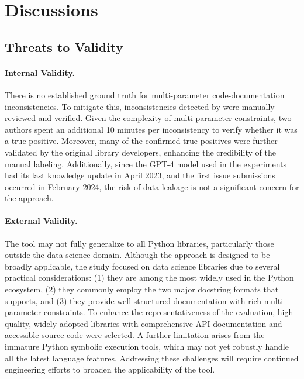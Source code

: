\section{Discussions}

\subsection{Threats to Validity}\label{sec:valid-mpchecker}

\paragraph{Internal Validity.}
There is no established ground truth for multi-parameter code-documentation inconsistencies. To
mitigate this, inconsistencies detected by \toolchecker were manually reviewed and verified. Given the
complexity of multi-parameter constraints, two authors spent an additional 10 minutes per
inconsistency to verify whether it was a true positive. Moreover, many of the confirmed true positives were further validated by the original library developers, enhancing the credibility of the manual labeling. Additionally, since the GPT-4 model used in the experiments had its last knowledge update in April 2023, and the first issue submissions occurred in February 2024, the risk of data leakage is not a significant concern for the approach.



\paragraph{External Validity.} 
The tool may not fully generalize to all Python libraries, particularly those outside the data science domain. Although the approach is designed to be broadly applicable, the study focused on data science libraries due to several practical considerations: (1) they are among the most widely used in the Python ecosystem, (2) they commonly employ the two major docstring formats that \toolchecker supports, and (3) they provide well-structured documentation with rich multi-parameter constraints. To enhance the representativeness of the evaluation, high-quality, widely adopted libraries with comprehensive API documentation and accessible source code were selected. A further limitation arises from the immature Python symbolic execution tools, which may not yet robustly handle all the latest language features. Addressing these challenges will require continued engineering efforts to broaden the applicability of the tool.



